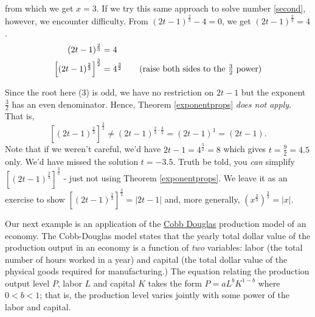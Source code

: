 from which we get $x = 3$.  If we try this same approach to solve number \ref{second}, however, we encounter difficulty.  From $(2t-1)^{\frac{2}{3}} -4 = 0$, we get $(2t-1)^{\frac{2}{3}}  =4$.  
\begin{align*}
(2t-1)^{\frac{2}{3}} & = 4 \\
 \left[(2t-1)^{\frac{2}{3}}  \right]^{\frac{3}{2}} & = 4^{\frac{3}{2}} \tag{raise both sides to the $\frac{3}{2}$ power} \\
\end{align*}
 
 Since the root here ($3$) is odd, we have no restriction on $2t-1$ but the exponent $\frac{3}{2}$ has an even denominator.  Hence, Theorem \ref{exponentprops} \textit{does not apply}.  That is, \[\left[(2t-1)^{\frac{2}{3}}  \right]^{\frac{3}{2}} \neq (2t-1)^{\frac{2}{3} \cdot \frac{3}{2}} = (2t-1)^{1} = (2t-1).\]
 Note that if we weren't careful, we'd have $2t-1 = 4^{\frac{3}{2}} = 8$ which gives $t= \frac{9}{2} = 4.5$ only.   We'd have missed the solution $t = -3.5$.  Truth be told, you \textit{can} simplify $\left[(2t-1)^{\frac{2}{3}}  \right]^{\frac{3}{2}} $ - just not using Theorem \ref{exponentprops}.  We leave it as an exercise to show  $\left[(2t-1)^{\frac{2}{3}}  \right]^{\frac{3}{2}} = |2t-1|$ and, more generally, $\left(x^{\frac{2}{3}}\right)^{\frac{3}{2}} = |x|$.
 
 Our next example is an application of the  \href{https://en.wikipedia.org/wiki/Cobb-Douglas_production_function}{\underline{Cobb Douglas}} production model of an economy.  The Cobb-Douglas model states that the yearly total dollar value of the production output in an economy is a function of \textit{two} variables:   labor (the total number of hours worked in a year) and capital (the total dollar value of the physical goods required for manufacturing.) The equation relating the production output level $P$, labor $L$ and capital $K$ takes the form $P = a L^{b} K^{1-b}$ where $0 < b < 1$; that is, the production level varies jointly with some power of the labor and capital.  

